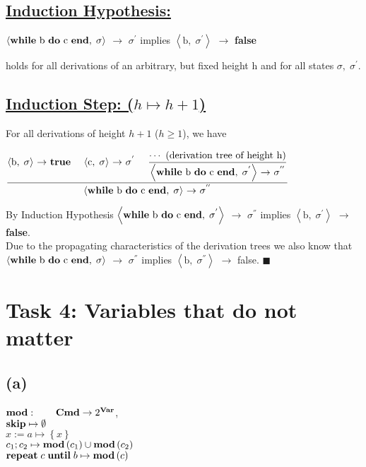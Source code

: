 \documentclass[12pt,a4paper]{article}
\newcommand{\eRelation}[2]{$\dfrac{\text{#1}}{\text{#2}}$}
\newcommand{\eState}[2]{$\left\langle \text{#1},\; \text{#2}\right\rangle$}
\newcommand{\eRule}[3]{\eState{#1}{#2} $\rightarrow$ #3}
\begin{document}
		\subsection*{\underline{Induction Hypothesis:}}
		\begin{center}
			\eRule{\textbf{while} b \textbf{do} c \textbf{end}}{$\sigma$}{$\sigma ^{'}$} implies \eRule{b}{$\sigma ^{'}$}{\textbf{false}}
		\end{center}
		\indent\indent holds for all derivations of an arbitrary, but fixed height h and for all states \indent$\sigma , \; \sigma ^{'}$.\\
		\subsection*{\underline{Induction Step: ({\boldmath$h\mapsto h+1$})}}
		\indent\indent For all derivations of height $h+1$ ($h\geq 1$), we have\\
		\begin{center}
			\eRelation
				{\eRule{b}{$\sigma$}{\textbf{true}} \quad \eRule{c}{$\sigma$}{$\sigma ^{'}$} \quad \eRelation{$\cdots$ (derivation tree of height h)}{\eRule{\textbf{while} b \textbf{do} c \textbf{end}}{$\sigma ^{'}$}{$\sigma ^{''}$}}}
				{\eRule{\textbf{while} b \textbf{do} c \textbf{end}}{$\sigma$}{$\sigma ^{''}$}}
		\end{center}
		\indent\indent By Induction Hypothesis \eRule{\textbf{while} b \textbf{do} c \textbf{end}}{$\sigma ^{'}$}{$\sigma ^{''}$} implies \eRule{b}{$\sigma ^{'}$}{\textbf{false}}.\\
		\indent Due to the propagating characteristics of the derivation trees we also know \indent that \eRule{\textbf{while} b \textbf{do} c \textbf{end}}{$\sigma$}{$\sigma ^{''}$} implies \eRule{b}{$\sigma ^{''}$}{false}. \qquad $\blacksquare$
	\section*{Task 4: Variables that do not matter}
	
	\subsection*{(a)}
	
	\indent\indent $\text{\textbf{mod}}: \qquad \text{\textbf{Cmd}}\rightarrow 2^{\text{\textbf{Var}}}$,\\
	\indent $\text{\textbf{skip}}\mapsto\emptyset$\\
	\indent $x:=a\mapsto \left\lbrace x \right\rbrace$\\
	\indent $c_1;c_2\mapsto \text{\textbf{mod}}\left( c_1\right) \cup\text{\textbf{mod}}\left( c_2\right)$\\
	\indent $\text{\textbf{repeat}}\; c\; \text{\textbf{until}}\; b \mapsto \text{\textbf{mod}}\left( c\right)$\\
	
\end{document}
